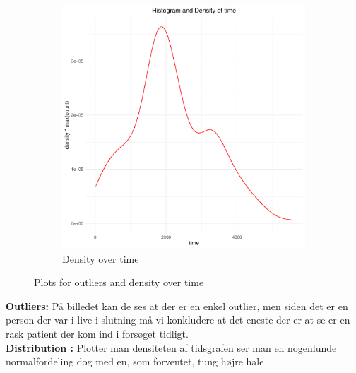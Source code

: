 \begin{enumerate}
\begin{figure}[H]
\begin{subfigure}[b]{0.49\textwidth}
    \includegraphics[width=\textwidth]{Basses_kode/Billeder_duration/Histogram_and_Density_of_ time .pdf}
    \caption{Density over time}
    \label{fig:long_ACF_residuals}
  \end{subfigure}
  \caption{Plots for outliers and density over time}
\end{figure}


\textbf{Outliers: }På billedet kan de ses at der er en enkel outlier, men siden det er en person der var i live i slutning må vi konkludere at det eneste der er at se er en rask patient der kom ind i forsøget tidligt.\\
\textbf{Distribution :} Plotter man densiteten af tidsgrafen ser man en nogenlunde normalfordeling dog med en, som forventet, tung højre hale



\end{enumerate}
